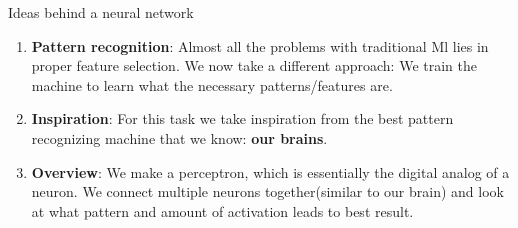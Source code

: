   
  \begin{frame}
  \end{frame}
  
  \usebackgroundtemplate{ }

\begin{frame}{Ideas behind a neural network}
\begin{enumerate}[$\bullet$]
    \item \textbf{Pattern recognition}: Almost all the problems with traditional Ml lies in proper feature selection. We now take a different approach: We train the machine to learn what the necessary patterns/features are.\pause
    \item \textbf{Inspiration}: For this task we take inspiration from the best pattern recognizing machine that we know:\pause\textbf{ our brains}.\pause
    \item \textbf{Overview}: We make a perceptron, which is essentially the digital analog of a neuron. We connect multiple neurons together(similar to our brain) and look at what pattern and amount of activation leads to best result.
\end{enumerate}
\end{frame}



